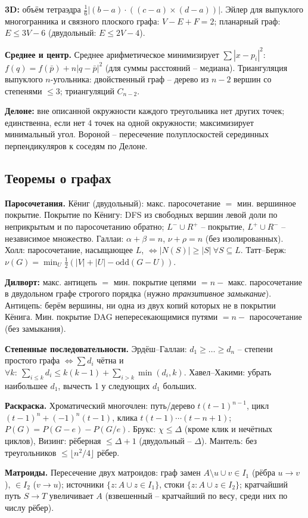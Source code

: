 \par \textbf{3D:} объём тетраэдра $\frac16|(b{-}a)\cdot((c{-}a)\times(d{-}a))|$. Эйлер для выпуклого многогранника и связного плоского графа: $V-E+F=2$; планарный граф: $E\le3V-6$ (двудольный: $E\le2V-4$).
\par \textbf{Среднее и центр.} Среднее арифметическое минимизирует $\sum|x-p_i|^2$: $f(q)=f(\bar p)+n|q-\bar p|^2$ (для суммы расстояний -- медиана). Триангуляция выпуклого $n$-угольника: двойственный граф -- дерево из $n{-}2$ вершин со степенями $\le3$; триангуляций $C_{n-2}$.
\par \textbf{Делоне:} вне описанной окружности каждого треугольника нет других точек; единственна, если нет 4 точек на одной окружности; максимизирует минимальный угол. Вороной -- пересечение полуплоскостей серединных перпендикуляров к соседям по Делоне.
\subsection{Теоремы о графах}
\textbf{Паросочетания.} Кёниг (двудольный): макс. паросочетание $=$ мин. вершинное покрытие. Покрытие по Кёнигу: DFS из свободных вершин левой доли по неприкрытым и по паросочетанию обратно; $L^-\cup R^+$ -- покрытие, $L^+\cup R^-$ -- независимое множество. Галлаи: $\alpha+\beta=n$, $\nu+\rho=n$ (без изолированных). Холл: паросочетание, насыщающее $L$, $\iff|N(S)|\ge|S|\ \forall S\subseteq L$. Татт--Берж: $\nu(G)=\min_{U}\frac12(|V|+|U|-\mathrm{odd}(G-U))$.
\par \textbf{Дилворт:} макс. антицепь $=$ мин. покрытие цепями $=n-$ макс. паросочетание в двудольном графе строгого порядка (нужно \emph{транзитивное замыкание}). Антицепь: берём вершины, ни одна из двух копий которых не в покрытии Кёнига. Мин. покрытие DAG непересекающимися путями $=n-$ паросочетание (без замыкания).
\par \textbf{Степенные последовательности.} Эрдёш--Галлаи: $d_1\ge\dots\ge d_n$ -- степени простого графа $\iff\sum d_i$ чётна и $\forall k:\ \sum_{i\le k}d_i\le k(k{-}1)+\sum_{i>k}\min(d_i,k)$. Хавел--Хакими: убрать наибольшее $d_1$, вычесть 1 у следующих $d_1$ больших.
\par \textbf{Раскраска.} Хроматический многочлен: путь/дерево $t(t{-}1)^{n-1}$, цикл $(t{-}1)^n+(-1)^n(t{-}1)$, клика $t(t{-}1)\cdots(t{-}n{+}1)$; $P(G)=P(G{-}e)-P(G/e)$. Брукс: $\chi\le\Delta$ (кроме клик и нечётных циклов), Визинг: рёберная $\le\Delta{+}1$ (двудольный -- $\Delta$). Мантель: без треугольников $\le\lfloor n^2/4\rfloor$ рёбер.
\par \textbf{Матроиды.} Пересечение двух матроидов: граф замен $A\setminus u\cup v\in I_1$ (рёбра $u{\to}v$), $\in I_2$ ($v{\to}u$); источники $\{z: A{\cup}z\in I_1\}$, стоки $\{z:A{\cup}z\in I_2\}$; кратчайший путь $S{\to}T$ увеличивает $A$ (взвешенный -- кратчайший по весу, среди них по числу рёбер).
